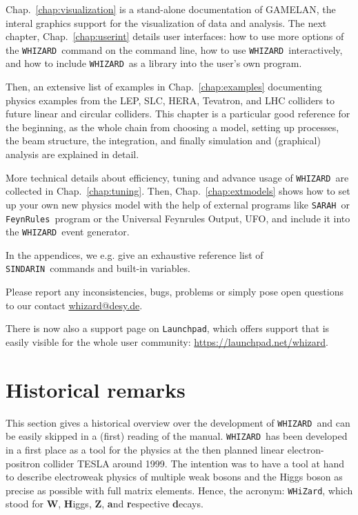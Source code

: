 \documentclass[12pt]{book}
\newcommand{\ttt}[1]{\texttt{#1}}
\newcommand{\whizard}{\ttt{WHIZARD}}
\newcommand{\sarah}{\ttt{SARAH}}
\newcommand{\FeynRules}{\ttt{FeynRules}}
\newcommand{\sindarin}{\ttt{SINDARIN}}
\begin{document}
Chap.~\ref{chap:visualization} is a stand-alone documentation of
GAMELAN, the interal graphics support for the visualization of data
and analysis. The next chapter, Chap.~\ref{chap:userint} details user
interfaces: how to use more options of the \whizard\ command on the
command line, how to use \whizard\ interactively, and how to include
\whizard\ as a library into the user's own program.

Then, an extensive list of examples in Chap.~\ref{chap:examples}
documenting physics examples from the LEP, SLC, HERA, Tevatron, and
LHC colliders to future linear and circular colliders. This chapter is
a particular good reference for the beginning, as the whole chain from
choosing a model, setting up processes, the beam structure, the
integration, and finally simulation and (graphical) analysis are
explained in detail.

More technical details about efficiency, tuning and advance usage of
\whizard\ are collected in Chap.~\ref{chap:tuning}. Then,
Chap.~\ref{chap:extmodels} shows how to set up your own new physics
model with the help of external programs like \sarah\ or
\FeynRules\ program or the Universal Feynrules Output, UFO, and
include it into the \whizard\ event generator.

In the appendices, we e.g. give an exhaustive reference list of
\sindarin\ commands and built-in variables.

Please report any inconsistencies, bugs, problems or simply pose open
questions to our contact \url{whizard@desy.de}.

There is now also a support page on \texttt{Launchpad}, which offers
support that is easily visible for the whole user community:
\url{https://launchpad.net/whizard}.




\section{Historical remarks}

This section gives a historical overview over the development of
\whizard\ and can be easily skipped in a (first) reading of the
manual. \whizard\ has been developed in a first place as a tool for
the physics at the then planned linear electron-positron collider
TESLA around 1999. The intention was to have a tool at hand to
describe electroweak physics of multiple weak bosons and the Higgs
boson as precise as possible with full matrix elements. Hence, the
acronym: \ttt{WHiZard}, which stood for $\mathbf{W}$, {\bf H}iggs,
$\mathbf{Z}$, {\bf a}nd {\bf r}espective {\bf d}ecays.
\end{document}
